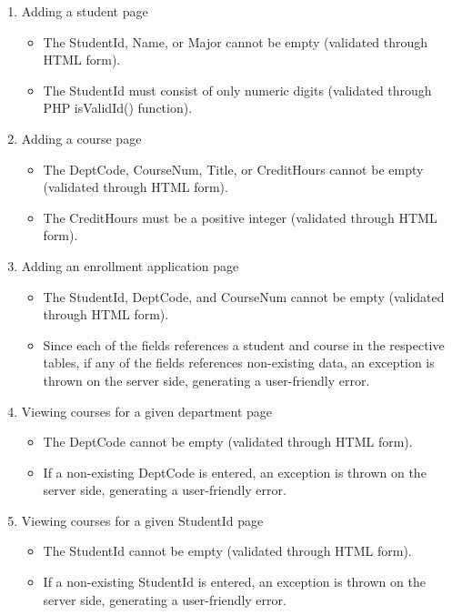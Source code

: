 \documentclass{article}      %
\begin{document}
\begin{enumerate}
\item Adding a student page
	\begin{itemize}
	\item The StudentId, Name, or Major cannot be empty (validated through HTML form).
	\item The StudentId must consist of only numeric digits
		(validated through PHP isValidId() function).
	\end{itemize}
\item Adding a course page
	\begin{itemize}
	\item The DeptCode, CourseNum, Title, or CreditHours cannot be empty (validated through HTML form).
	\item The CreditHours must be a positive integer (validated through HTML form).
	\end{itemize}
\item Adding an enrollment application page
	\begin{itemize}
	\item The StudentId, DeptCode, and CourseNum cannot be empty (validated through HTML form).
	\item Since each of the fields references a student and course in the respective tables, if any of the fields references non-existing data, an exception is thrown on the server side, generating a user-friendly error.  
	\end{itemize}
\item Viewing courses for a given department page
	\begin{itemize}
	\item The DeptCode cannot be empty (validated through HTML form).
	\item If a non-existing DeptCode is entered, an exception is thrown on the server side, generating a user-friendly error.
	\end{itemize}
\item Viewing courses for a given StudentId page
	\begin{itemize}
	\item The StudentId cannot be empty (validated through HTML form).
	\item If a non-existing StudentId is entered, an exception is thrown on the server side, generating a user-friendly error.
	\end{itemize}
\end{enumerate}
\end{document}
